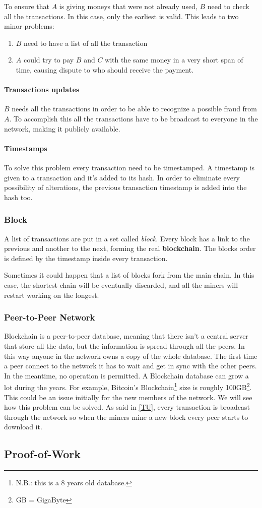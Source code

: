 To ensure that $A$ is giving moneys that were not already used, $B$ need to
check all the transactions. In this case, only the earliest is 
valid\cite{nakamoto08}. This leads to two minor problems:
\begin{enumerate}
 \item $B$ need to have a list of all the transaction
 \item $A$ could try to pay $B$ and $C$ with the same money in a very short
span of time, causing dispute to who should receive the payment.
\end{enumerate}

\paragraph*{Transactions updates}
\label{TU}
$B$ needs all the transactions in order to be able to recognize a possible
fraud from $A$. To accomplish this all the transactions have to be broadcast to
everyone in the network, making it publicly available.

\paragraph*{Timestamps}
To solve this problem every transaction need to be timestamped. A timestamp is 
given to a transaction and it's added to its hash. In order to eliminate every 
possibility of alterations, the previous transaction timestamp is added into 
the hash too.

\subsubsection{Block}
A list of transactions are put in a set called \textit{block}. Every block has
a link to the previous and another to the next, forming the real 
\textbf{blockchain}.
The blocks order is defined by the timestamp inside every transaction.

Sometimes it could happen that a list of blocks fork from the main chain. In
this case, the shortest chain will be eventually discarded, and all the miners
will restart working on the longest\cite{sok15}.

\subsubsection{Peer-to-Peer Network}

Blockchain is a peer-to-peer database, meaning that there isn't a central
server that store all the data, but the information is spread through all the 
peers.
In this way anyone in the network owns a copy of the whole database. The first
time a peer connect to the network it has to wait and get in sync with the 
other peers. In the meantime, no operation is permitted. A Blockchain database 
can grow a lot during the years. For example, Bitcoin's 
Blockchain\footnote{N.B.: this is a 8 years old database.} size is roughly 
100GB\footnote{GB = GigaByte}. This could be an issue initially for the new 
members of the network. We will see how this problem can be solved.
As said in \ref{TU}, every transaction is broadcast through the network so when
the miners mine a new block every peer starts to download it.

\subsection{Proof-of-Work}
